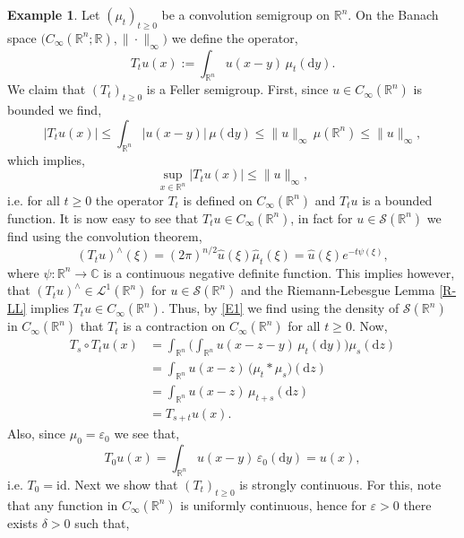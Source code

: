 \documentclass[a4paper, 12pt]{report}
\theoremstyle{remark}
\theoremstyle{definition}
\newtheorem{example}[theorem]{Example}
\begin{document}
\begin{example}\label{FTaSOSE1}
Let $(\mu_t)_{t \ge 0}$ be a convolution semigroup on $\mathbb{R}^n$.  On the Banach space $\big(C_\infty(\mathbb{R}^n; \mathbb{R}), \|\cdot\|_\infty\big)$ we define the operator,
\begin{equation}
T_tu(x) := \int_{\mathbb{R}^n}u(x - y)\,\mu_t(\mathrm{d}y).\label{FSO}
\end{equation}
We claim that $(T_t)_{t \ge 0}$ is a Feller semigroup.  First, since $u \in C_\infty(\mathbb{R}^n)$ is bounded we find,
$$
|T_tu(x)| \le \int_{\mathbb{R}^n}|u(x - y)|\,\mu(\mathrm{d}y) \le \|u\|_\infty\,\mu(\mathbb{R}^n) \le \|u\|_\infty,
$$
which implies,
\begin{equation}
\sup_{x \in \mathbb{R}^n}|T_tu(x)| \le \|u\|_\infty,\label{E1}
\end{equation}
i.e. for all $t \ge 0$ the operator $T_t$ is defined on $C_\infty(\mathbb{R}^n)$ and $T_tu$ is a bounded function.  It is now easy to see that $T_tu \in C_\infty(\mathbb{R}^n)$, in fact for $u \in \mathcal{S}(\mathbb{R}^n)$ we find using the convolution theorem,
\begin{equation}
(T_tu)^\wedge(\xi) = (2\pi)^{n/2}\hat{u}(\xi)\hat{\mu}_t(\xi) = \hat{u}(\xi)e^{-t\psi(\xi)},\label{E2}
\end{equation}
where $\psi : \mathbb{R}^n \to \mathbb{C}$ is a continuous negative definite function.  This implies however, that $(T_tu)^\wedge \in \mathcal{L}^1(\mathbb{R}^n)$ for $u \in \mathcal{S}(\mathbb{R}^n)$ and the Riemann-Lebesgue Lemma \eqref{R-LL} implies $T_tu \in C_\infty(\mathbb{R}^n)$.  Thus, by \eqref{E1} we find using the density of $\mathcal{S}(\mathbb{R}^n)$ in $C_\infty(\mathbb{R}^n)$ that $T_t$ is a contraction on $C_\infty(\mathbb{R}^n)$ for all $t \ge 0$.  Now,
$$
\begin{aligned}
T_s \circ T_tu(x) & = \int_{\mathbb{R}^n}\bigg(\int_{\mathbb{R}^n}u(x - z - y)\,\mu_t(\mathrm{d}y)\bigg)\mu_s(\mathrm{d}z)\\
& = \int_{\mathbb{R}^n}u(x - z)\,\big(\mu_t\ast\mu_s\big)(\mathrm{d}z)\\
& = \int_{\mathbb{R}^n}u(x - z)\,\mu_{t + s}(\mathrm{d}z)\\
& = T_{s + t}u(x).
\end{aligned}
$$
Also, since $\mu_0 = \varepsilon_0$ we see that,
$$
T_0u(x) = \int_{\mathbb{R}^n}u(x - y)\,\varepsilon_0(\mathrm{d}y) = u(x),
$$
i.e. $T_0 = \mathrm{id}$.  Next we show that $(T_t)_{t \ge 0}$ is strongly continuous.  For this, note that any function in $C_\infty(\mathbb{R}^n)$ is uniformly continuous, hence for $\varepsilon > 0$ there exists $\delta > 0$ such that,

\end{example}
\end{document}
